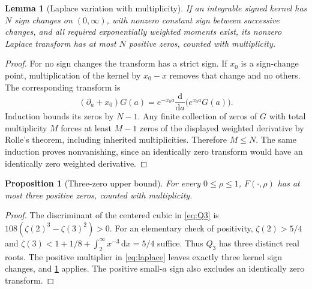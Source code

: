 \documentclass[11pt]{article}
\numberwithin{equation}{section}
\newtheorem{lemma}[lemma]{Lemma}
\newtheorem{proposition}[proposition]{Proposition}
\theoremstyle{definition}
\newcommand{\dd}{\,\mathrm d}
\begin{document}
\begin{lemma}[Laplace variation with multiplicity]\label{lem:laplacevariation}
If an integrable signed kernel has $N$ sign changes on $(0,\infty)$, with
nonzero constant sign between successive changes, and all required
exponentially weighted moments exist, its nonzero Laplace transform has at
most $N$ positive zeros, counted with multiplicity.
\end{lemma}
\begin{proof}
For no sign changes the transform has a strict sign. If $x_0$ is a sign-change
point, multiplication of the kernel by $x_0-x$ removes that change and no
others. The corresponding transform is
\[
 (\partial_a+x_0)G(a)=e^{-x_0a}\frac{\mathrm d}{\mathrm da}
                         \bigl(e^{x_0a}G(a)\bigr).
\]
Induction bounds its zeros by $N-1$. Any finite collection of zeros of $G$
with total multiplicity $M$ forces at least $M-1$ zeros of the displayed
weighted derivative by Rolle's theorem, including inherited multiplicities.
Therefore $M\leq N$. The same induction proves nonvanishing, since an
identically zero transform would have an identically zero weighted derivative.
\end{proof}

\begin{proposition}[Three-zero upper bound]\label{prop:three}
For every $0\leq\rho\leq1$, $F(\cdot,\rho)$ has at most three positive zeros,
counted with multiplicity.
\end{proposition}
\begin{proof}
The discriminant of the centered cubic in \eqref{eq:Q3} is
$108(\zeta(2)^3-\zeta(3)^2)>0$. For an elementary check of positivity,
$\zeta(2)>5/4$ and
$\zeta(3)<1+1/8+\int_2^\infty x^{-3}\dd x=5/4$ suffice.
Thus $Q_3$ has three distinct real roots. The positive multiplier in
\eqref{eq:laplace} leaves exactly three kernel sign changes, and
\cref{lem:laplacevariation} applies. The positive small-$a$ sign also
excludes an identically zero transform.
\end{proof}
\end{document}
